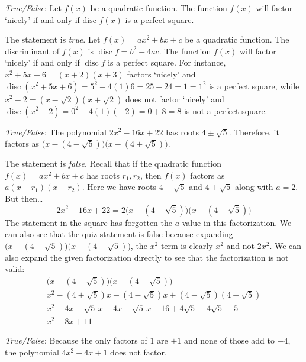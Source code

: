 \documentclass[11pt,letterpaper]{article}
\DeclareMathOperator{\disc}{disc}	%
\begin{document}
\quizsol \textit{True/False}: Let $f(x)$ be a quadratic function. The function $f(x)$ will factor `nicely' if and only if $\text{disc } f(x)$ is a perfect square. \pspace

\sol The statement is \textit{true}. Let $f(x)= ax^2 + bx + c$ be a quadratic function. The discriminant of $f(x)$ is $\disc f= b^2 - 4ac$. The function $f(x)$ will factor `nicely' if and only if $\disc f$ is a perfect square. For instance, $x^2 + 5x + 6= (x + 2)(x + 3)$ factors `nicely' and $\disc(x^2 + 5x + 6)= 5^2 - 4(1)6= 25 - 24= 1= 1^2$ is a perfect square, while $x^2 - 2= (x - \sqrt{2})(x + \sqrt{2})$ does not factor `nicely' and $\disc(x^2 - 2)= 0^2 - 4(1)(-2)= 0 + 8= 8$ is not a perfect square. \pvspace{1.1cm}



\quizsol \textit{True/False}: The polynomial $2x^2 - 16x + 22$ has roots $4 \pm \sqrt{5}$. Therefore, it factors as $\big(x - (4 - \sqrt{5}) \big) \big(x - (4 + \sqrt{5}) \big)$. \pspace

\sol The statement is \textit{false}. Recall that if the quadratic function $f(x)= ax^2 + bx + c$ has roots $r_1, r_2$, then $f(x)$ factors as $a(x - r_1)(x - r_2)$. Here we have roots $4 - \sqrt{5}$ and $4 + \sqrt{5}$ along with $a= 2$. But then\dots
	\[
	2x^2 - 16x + 22= 2 \big(x - (4 - \sqrt{5}) \big) \big(x - (4 + \sqrt{5}) \big)
	\]
The statement in the square has forgotten the $a$-value in this factorization. We can also see that the quiz statement is false because expanding $\big(x - (4 - \sqrt{5}) \big) \big(x - (4 + \sqrt{5}) \big)$, the $x^2$-term is clearly $x^2$ and not $2x^2$. We can also expand the given factorization directly to see that the factorization is not valid:
	\[
	\begin{gathered}
	\big(x - (4 - \sqrt{5}) \big) \big(x - (4 + \sqrt{5}) \big) \\
	x^2 - (4 + \sqrt{5}) x - (4 - \sqrt{5}) x + (4 - \sqrt{5}) (4 + \sqrt{5}) \\
	x^2 - 4x - \sqrt{5} \, x - 4x + \sqrt{5} \, x + 16 + 4 \sqrt{5} - 4 \sqrt{5} - 5 \\
	x^2 - 8x + 11
	\end{gathered}
	\]



\quizsol \textit{True/False}: Because the only factors of $1$ are $\pm 1$ and none of those add to $-4$, the polynomial $4x^2 - 4x + 1$ does not factor. \pspace
\end{document}
